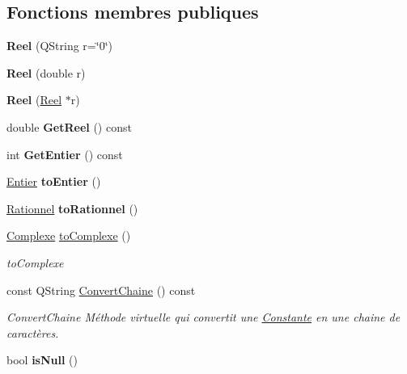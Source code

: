 \subsection*{Fonctions membres publiques}
\begin{DoxyCompactItemize}
\item 
\hypertarget{class_calcul_1_1_reel_ae0b25df32769db7d5108c181b64657c2}{{\bfseries Reel} (Q\-String r=\char`\"{}0\char`\"{})}\label{class_calcul_1_1_reel_ae0b25df32769db7d5108c181b64657c2}

\item 
\hypertarget{class_calcul_1_1_reel_a19d0ce325d4a7a3b9a299b792702168a}{{\bfseries Reel} (double r)}\label{class_calcul_1_1_reel_a19d0ce325d4a7a3b9a299b792702168a}

\item 
\hypertarget{class_calcul_1_1_reel_a6b1310b24cd92b2d59a646cadc29f576}{{\bfseries Reel} (\hyperlink{class_calcul_1_1_reel}{Reel} $\ast$r)}\label{class_calcul_1_1_reel_a6b1310b24cd92b2d59a646cadc29f576}

\item 
\hypertarget{class_calcul_1_1_reel_a75a6a4a791f47a05c38b92244f6cf5a0}{double {\bfseries Get\-Reel} () const }\label{class_calcul_1_1_reel_a75a6a4a791f47a05c38b92244f6cf5a0}

\item 
\hypertarget{class_calcul_1_1_reel_a6660d6f839cf55825042f458a0ec7e54}{int {\bfseries Get\-Entier} () const }\label{class_calcul_1_1_reel_a6660d6f839cf55825042f458a0ec7e54}

\item 
\hypertarget{class_calcul_1_1_reel_ae334416316678b356875791e125ba14a}{\hyperlink{class_calcul_1_1_entier}{Entier} {\bfseries to\-Entier} ()}\label{class_calcul_1_1_reel_ae334416316678b356875791e125ba14a}

\item 
\hypertarget{class_calcul_1_1_reel_ae21a0235c35a7fbb87c7c36108d861b9}{\hyperlink{class_calcul_1_1_rationnel}{Rationnel} {\bfseries to\-Rationnel} ()}\label{class_calcul_1_1_reel_ae21a0235c35a7fbb87c7c36108d861b9}

\item 
\hyperlink{class_calcul_1_1_complexe}{Complexe} \hyperlink{class_calcul_1_1_reel_a222b9929b24dfee2928191055f1d03fa}{to\-Complexe} ()
\begin{DoxyCompactList}\small\item\em to\-Complexe \end{DoxyCompactList}\item 
const Q\-String \hyperlink{class_calcul_1_1_reel_a92c0a269edf334bba71b08ef0e9e27e8}{Convert\-Chaine} () const 
\begin{DoxyCompactList}\small\item\em Convert\-Chaine Méthode virtuelle qui convertit une \hyperlink{class_calcul_1_1_constante}{Constante} en une chaine de caractères. \end{DoxyCompactList}\item 
\hypertarget{class_calcul_1_1_reel_a892118585b915fb12426c3d636166be2}{bool {\bfseries is\-Null} ()}\label{class_calcul_1_1_reel_a892118585b915fb12426c3d636166be2}


\end{DoxyCompactItemize}
